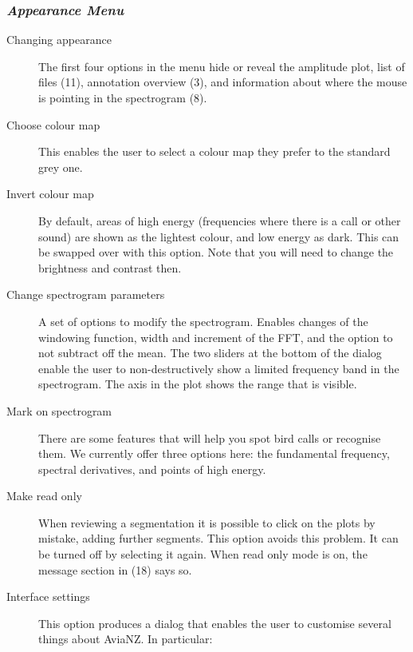 \documentclass{article}
\begin{document}
\subsubsection{{\em Appearance Menu}}

\begin{description}
\item [Changing appearance] The first four options in the menu hide or reveal the amplitude plot, list of files (11), annotation overview (3), and information about where the mouse is pointing in the spectrogram (8). 
\item [Choose colour map] This enables the user to select a colour map they prefer to the standard grey one. 
\item [Invert colour map] By default, areas of high energy (frequencies where there is a call or other sound) are shown as the lightest colour, and low energy as dark. This can be swapped over with this option. Note that you will need to change the brightness and contrast then. 
\item [Change spectrogram parameters] A set of options to modify the spectrogram. Enables changes of the windowing function, width and increment of the FFT, and the option to not subtract off the mean. %
The two sliders at the bottom of the dialog enable the user to non-destructively show a limited frequency band in the spectrogram. The axis in the plot shows the range that is visible. 
\item [Mark on spectrogram] There are some features that will help you spot bird calls or recognise them. We currently offer three options here: the fundamental frequency, spectral derivatives, and points of high energy. %
\item [Make read only] When reviewing a segmentation it is possible to click on the plots by mistake, adding further segments. This option avoids this problem. It can be turned off by selecting it again. When read only mode is on, the message section in (18) says so. 
\item [Interface settings] This option produces a dialog that enables the user to customise several things about AviaNZ. In particular:
\begin{description}

\end{description}
\end{description}
\end{document}

